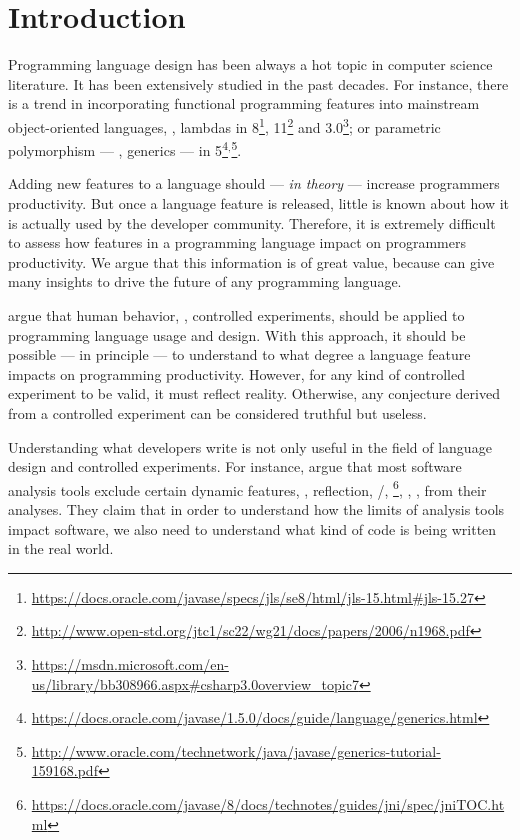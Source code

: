 
\chapter{Introduction}

Programming language design has been always a hot topic in computer science literature.
It has been extensively studied in the past decades.
For instance, there is a trend in incorporating functional programming features into mainstream object-oriented languages, \eg{}, lambdas in \java{} 8\footnote{\url{https://docs.oracle.com/javase/specs/jls/se8/html/jls-15.html\#jls-15.27}}, \cpp{}11\footnote{\url{http://www.open-std.org/jtc1/sc22/wg21/docs/papers/2006/n1968.pdf}} and \cs{} 3.0\footnote{\url{https://msdn.microsoft.com/en-us/library/bb308966.aspx\#csharp3.0overview_topic7}};
or parametric polymorphism --- \ie{}, generics --- in \java{} 5\footnote{\url{https://docs.oracle.com/javase/1.5.0/docs/guide/language/generics.html}}$^{,}$\footnote{\url{http://www.oracle.com/technetwork/java/javase/generics-tutorial-159168.pdf}}.

Adding new features to a language should --- \emph{in theory} --- increase programmers productivity.
But once a language feature is released, little is known about how it is actually used by the developer community.
Therefore, it is extremely difficult to assess how features in a programming language impact on programmers productivity.
We argue that this information is of great value, because can give many insights to drive the future of any programming language.

\cite{hanenberg_faith_2010,hanenberg_why_2014} argue that human behavior, \ie{}, controlled experiments, should be applied to programming language usage and design.
With this approach, it should be possible --- in principle --- to understand to what degree a language feature impacts on programming productivity.
However, for any kind of controlled experiment to be valid, it must reflect reality.
Otherwise, any conjecture derived from a controlled experiment can be considered truthful but useless.

Understanding what developers write is not only useful in the field of language design and controlled experiments.
For instance, \cite{livshits_defense_2015} argue that most software analysis tools exclude certain dynamic features, \eg{}, reflection, \setjmp{}/\longjmp{}, \jni{}\footnote{\url{https://docs.oracle.com/javase/8/docs/technotes/guides/jni/spec/jniTOC.html}}, \eval{}, \etc{}, from their analyses.
They claim that in order to understand how the limits of analysis tools impact software,
we also need to understand what kind of code is being written in the real world.

